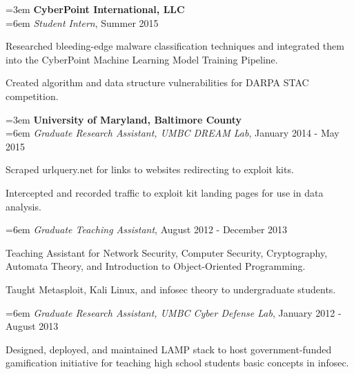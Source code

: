 \documentclass[a4paper, 11pt]{article}
\newcommand{\tab}{\hspace*{3em}}
\newcommand{\atab}{\hangindent=3em \hangafter=0}
\newcommand{\btab}{\hangindent=6em \hangafter=0}
\newenvironment{my_list}
{\begin{itemize}
    \vspace{-4mm}
    \setlength{\itemsep}{0pt}
    \setlength{\itemindent}{6em}
    \setlength{\parskip}{0pt}
    \setlength{\parsep}{0pt}}
{\end{itemize}}
\begin{document}
\medskip
\atab \textbf{CyberPoint International, LLC}\\
\btab \textit{Student Intern}, Summer 2015\\
\begin{my_list}
\item Researched bleeding-edge malware classification techniques and integrated them\\ \tab \tab into the CyberPoint Machine Learning Model Training Pipeline.
\item Created algorithm and data structure vulnerabilities for DARPA STAC competition.
\end{my_list}

\medskip
\atab \textbf{University of Maryland, Baltimore County}\\
\btab \textit{Graduate Research Assistant, UMBC DREAM Lab}, January 2014 - May 2015\\
\begin{my_list}
\item Scraped urlquery.net for links to websites redirecting to exploit kits.
\item Intercepted and recorded traffic to exploit kit landing pages for use in data analysis.
\end{my_list}

\btab \textit{Graduate Teaching Assistant}, August 2012 - December 2013\\
\begin{my_list}
\item Teaching Assistant for Network Security, Computer Security, Cryptography,\\ \tab \tab Automata Theory, and Introduction to Object-Oriented Programming.
\item Taught Metasploit, Kali Linux, and infosec theory to undergraduate students.
\end{my_list}

\btab \textit{Graduate Research Assistant, UMBC Cyber Defense Lab}, January 2012 - August 2013\\
\begin{my_list}
\item Designed, deployed, and maintained LAMP stack to host government-funded\\ \tab \tab gamification initiative for teaching high school students basic concepts in infosec.
\end{my_list}
\end{document}
